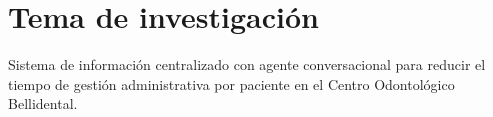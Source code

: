 \section{Tema de investigación}


Sistema de información centralizado con agente conversacional para reducir el tiempo de gestión administrativa por paciente en el Centro Odontológico Bellidental.
